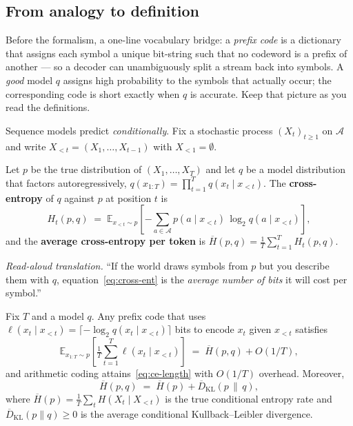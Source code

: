 \subsection*{From analogy to definition}

Before the formalism, a one-line vocabulary bridge: a \emph{prefix
code} is a dictionary that assigns each symbol a unique bit-string
such that no codeword is a prefix of another --- so a decoder can
unambiguously split a stream back into symbols.  A \emph{good} model
$q$ assigns high probability to the symbols that actually occur;
the corresponding code is short exactly when $q$ is accurate.  Keep
that picture as you read the definitions.

Sequence models predict \emph{conditionally}.  Fix a stochastic
process $(X_t)_{t \ge 1}$ on $\mathcal{A}$ and write
$X_{<t} = (X_1, \dots, X_{t-1})$ with $X_{<1} = \emptyset$.

\begin{definition}
\label{def:cross-ent}
Let $p$ be the true distribution of $(X_1, \dots, X_T)$ and let $q$
be a model distribution that factors autoregressively,
$q(x_{1:T}) = \prod_{t=1}^{T} q(x_t \mid x_{<t})$.  The
\textbf{cross-entropy} of $q$ against $p$ at position $t$ is
\begin{equation}
  H_t(p, q)
  \;=\; \mathbb{E}_{x_{<t}\sim p}\!\left[
    -\sum_{a\in\mathcal{A}} p(a \mid x_{<t})\,\log_2 q(a \mid x_{<t})
  \right],
  \label{eq:cross-ent}
\end{equation}
and the \textbf{average cross-entropy per token} is
$\overline{H}(p,q) = \tfrac{1}{T}\sum_{t=1}^{T} H_t(p,q)$.
\end{definition}

\noindent
\emph{Read-aloud translation.}  ``If the world draws symbols from
$p$ but you describe them with $q$, equation~\eqref{eq:cross-ent} is
the \emph{average number of bits} it will cost per symbol.''

\begin{theorem}
\label{thm:ce-code}
Fix $T$ and a model $q$.  Any prefix code that uses
$\ell(x_t \mid x_{<t}) = \lceil -\log_2 q(x_t \mid x_{<t})\rceil$
bits to encode $x_t$ given $x_{<t}$ satisfies
\begin{equation}
  \mathbb{E}_{x_{1:T}\sim p}\!\left[\tfrac{1}{T}\!\sum_{t=1}^{T}\ell(x_t \mid x_{<t})\right]
  \;=\; \overline{H}(p, q) + O(1/T),
  \label{eq:ce-length}
\end{equation}
and arithmetic coding attains~\eqref{eq:ce-length} with $O(1/T)$
overhead.  Moreover,
\begin{equation}
  \overline{H}(p, q)
  \;=\; \overline{H}(p) + \overline{D}_{\mathrm{KL}}(p \,\|\, q),
  \label{eq:ce-kl}
\end{equation}
where $\overline{H}(p) = \tfrac{1}{T}\sum_t H(X_t \mid X_{<t})$ is
the true conditional entropy rate and
$\overline{D}_{\mathrm{KL}}(p\|q) \ge 0$ is the average conditional
Kullback--Leibler divergence.
\end{theorem}

